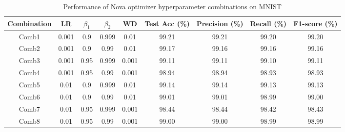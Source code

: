 \documentclass{article}
\begin{document}
\begin{table}[H]
\centering
\caption{Performance of Nova optimizer hyperparameter combinations on MNIST}
\begin{tabular}{ccccccccc}
\toprule
Combination & LR & $\beta_1$ & $\beta_2$ & WD & Test Acc (\%) & Precision (\%) & Recall (\%) & F1-score (\%) \\
\midrule
Comb1 & 0.001 & 0.9 & 0.999 & 0.01 & 99.21 & 99.21 & 99.20 & 99.20 \\
Comb2 & 0.001 & 0.9 & 0.99 & 0.01 & 99.17 & 99.16 & 99.16 & 99.16 \\
Comb3 & 0.001 & 0.95 & 0.999 & 0.001 & 99.11 & 99.11 & 99.10 & 99.11 \\
Comb4 & 0.001 & 0.95 & 0.99 & 0.001 & 98.94 & 98.94 & 98.93 & 98.93 \\
Comb5 & 0.01 & 0.9 & 0.999 & 0.01 & 99.14 & 99.14 & 99.13 & 99.13 \\
Comb6 & 0.01 & 0.9 & 0.99 & 0.01 & 99.01 & 99.01 & 98.99 & 99.00 \\
Comb7 & 0.01 & 0.95 & 0.999 & 0.001 & 98.44 & 98.44 & 98.42 & 98.43 \\
Comb8 & 0.01 & 0.95 & 0.99 & 0.001 & 99.00 & 99.00 & 98.99 & 98.99 \\
\bottomrule
\end{tabular}
\label{tab:nova_mnistcomb}
\end{table}
\end{document}
